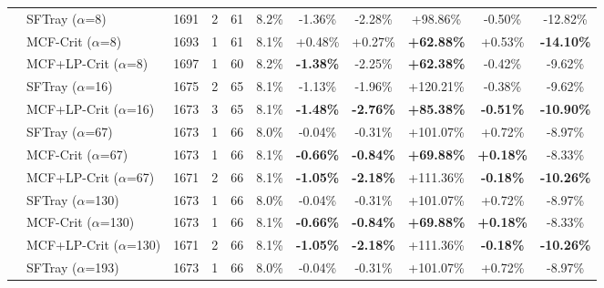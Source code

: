 \begin{table}[t]
{\begin{tabular}{ll|cccc|ccc|cc}
 & SFTray ($\alpha$=8) & 1691 & 2 & 61 & 8.2\% & -1.36\% & -2.28\% & +98.86\% & -0.50\% & -12.82\% \\

 & MCF-Crit ($\alpha$=8) & 1693 & 1 & 61 & 8.1\% & +0.48\% & +0.27\% & \textbf{+62.88\%} & +0.53\% & \textbf{-14.10\%} \\

 & MCF+LP-Crit ($\alpha$=8) & 1697 & 1 & 60 & 8.2\% & \textbf{-1.38\%} & -2.25\% & \textbf{+62.38\%} & -0.42\% & -9.62\% \\

\addlinespace[0.5em]

 & SFTray ($\alpha$=16) & 1675 & 2 & 65 & 8.1\% & -1.13\% & -1.96\% & +120.21\% & -0.38\% & -9.62\% \\

 & MCF+LP-Crit ($\alpha$=16) & 1673 & 3 & 65 & 8.1\% & \textbf{-1.48\%} & \textbf{-2.76\%} & \textbf{+85.38\%} & \textbf{-0.51\%} & \textbf{-10.90\%} \\

\addlinespace[0.5em]

 & SFTray ($\alpha$=67) & 1673 & 1 & 66 & 8.0\% & -0.04\% & -0.31\% & +101.07\% & +0.72\% & -8.97\% \\

 & MCF-Crit ($\alpha$=67) & 1673 & 1 & 66 & 8.1\% & \textbf{-0.66\%} & \textbf{-0.84\%} & \textbf{+69.88\%} & \textbf{+0.18\%} & -8.33\% \\

 & MCF+LP-Crit ($\alpha$=67) & 1671 & 2 & 66 & 8.1\% & \textbf{-1.05\%} & \textbf{-2.18\%} & +111.36\% & \textbf{-0.18\%} & \textbf{-10.26\%} \\

\addlinespace[0.5em]

 & SFTray ($\alpha$=130) & 1673 & 1 & 66 & 8.0\% & -0.04\% & -0.31\% & +101.07\% & +0.72\% & -8.97\% \\

 & MCF-Crit ($\alpha$=130) & 1673 & 1 & 66 & 8.1\% & \textbf{-0.66\%} & \textbf{-0.84\%} & \textbf{+69.88\%} & \textbf{+0.18\%} & -8.33\% \\

 & MCF+LP-Crit ($\alpha$=130) & 1671 & 2 & 66 & 8.1\% & \textbf{-1.05\%} & \textbf{-2.18\%} & +111.36\% & \textbf{-0.18\%} & \textbf{-10.26\%} \\

\addlinespace[0.5em]

 & SFTray ($\alpha$=193) & 1673 & 1 & 66 & 8.0\% & -0.04\% & -0.31\% & +101.07\% & +0.72\% & -8.97\% \\


\end{tabular}}
\end{table}
